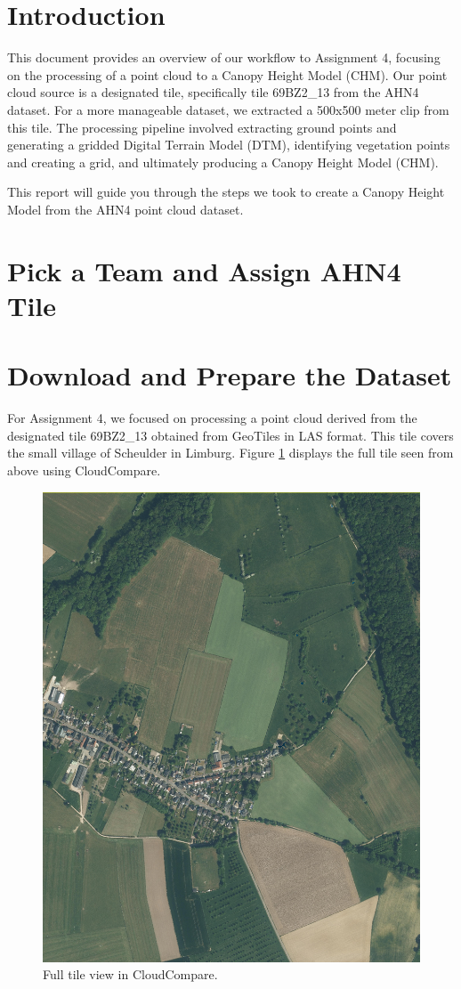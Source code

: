 \documentclass{article}
\begin{document}

\newpage

\tableofcontents
\newpage


\section{Introduction}

This document provides an overview of our workflow to Assignment 4, focusing on the processing of a point cloud to a Canopy Height Model (CHM). Our point cloud source is a designated tile, specifically tile 69BZ2\_13 from the AHN4 dataset. For a more manageable dataset, we extracted a 500x500 meter clip from this tile. The processing pipeline involved extracting ground points and generating a gridded Digital Terrain Model (DTM), identifying vegetation points and creating a grid, and ultimately producing a Canopy Height Model (CHM).

This report will guide you through the steps we took to create a Canopy Height Model from the AHN4 point cloud dataset.
\newpage

\section{Pick a Team and Assign AHN4 Tile}
\newpage


\section{Download and Prepare the Dataset}

For Assignment 4, we focused on processing a point cloud derived from the designated tile 69BZ2\_13 obtained from GeoTiles in LAS format. This tile covers the small village of Scheulder in Limburg. Figure \ref{fig:full_tile} displays the full tile seen from above using CloudCompare.

\begin{figure}[h]
  \centering
  \includegraphics[width=0.5\linewidth]{img/screenshot_full_tile.png}
  \caption{Full tile view in CloudCompare.}
  \label{fig:full_tile}
\end{figure}
\end{document}
